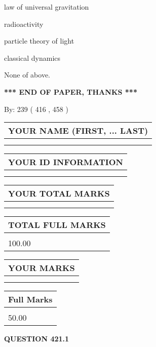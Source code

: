\documentclass[12pt]{article}
\begin{document}
 
law of universal gravitation
 
 
radioactivity
 
 
particle theory of light
 
 
classical dynamics
 
 
 None of above.
 
 
   
   
\vspace{1.0in} 
{\textbf{\large{ *** END OF PAPER, THANKS *** }}} 
   
   
\hspace{1.0in} By: 
 239 ( 416 ,  458 )
   
   
   
   
\newpage 
\setcounter{page}{ 
   421001 } 
   
   
   
   
\noindent\begin{tabular}{|l|}
\hline
YOUR NAME (FIRST, ... LAST)  \\
\hline
 \\ 
 \\ 
\hline
\end{tabular}
\hspace{0.05in} \begin{tabular}{|l|}
\hline
 YOUR   ID   INFORMATION  \\
\hline
 \\ 
 \\ 
\hline
\end{tabular}
   
   
\vspace{0.2in}\noindent\begin{tabular}{|l|}
\hline
YOUR TOTAL MARKS  \\
\hline
 \\ 
 \\ 
\hline
\end{tabular}
\hspace{0.05in} \begin{tabular}{|l|}
\hline
TOTAL FULL MARKS  \\
\hline
 \\ 
100.00 \\
\hline
\end{tabular}
  
\vspace{0.2in}
  
\noindent\begin{tabular}{|l|}
\hline
 YOUR MARKS  \\
\hline
 \\ 
 \\ 
\hline
\end{tabular}
\hspace{0.05in} \begin{tabular}{|l|}
\hline
 Full Marks  \\
\hline
 \\ 
50.00 \\
\hline
\end{tabular}
{\textbf{\Large{QUESTION
421.1 
}}}
  
\end{document}
